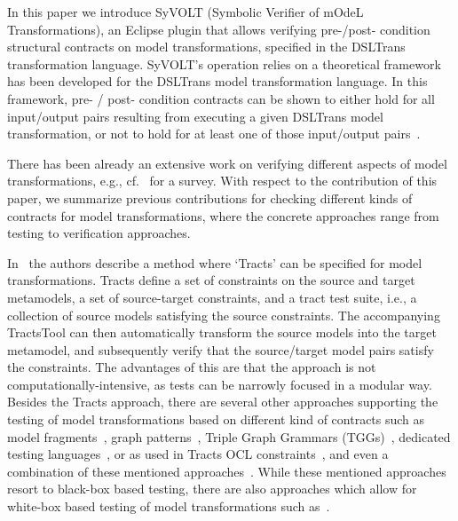 In this paper we introduce SyVOLT (Symbolic Verifier of mOdeL Transformations),
an Eclipse plugin that allows verifying pre-/post- condition structural
contracts on model transformations, specified in the DSLTrans transformation
language. SyVOLT's operation relies on a theoretical framework has been
developed for the DSLTrans model transformation language. In this framework,
pre- / post- condition contracts can be shown to either hold for all input/output pairs resulting from
executing a given DSLTrans model transformation, or not to hold for at least
one of those input/output pairs~\cite{Lucio2014}.


There has been already an extensive work on verifying different aspects of model
transformations, e.g., cf.~\cite{AmraniLSCDVTC12} for a survey.
With respect to the contribution of this paper, we summarize previous
contributions for checking different kinds of contracts for model
transformations, where the concrete approaches range from testing to
verification approaches.

In~\cite{Gogolla2011,Vallecillo2012} the authors describe a method where
`Tracts' can be specified for model transformations. Tracts define a set of
constraints on the source and target metamodels, a set of source-target
constraints, and a tract test suite, i.e., a collection of source models
satisfying the source constraints. The accompanying TractsTool can then
automatically transform the source models into the target metamodel, and
subsequently verify that the source/target model pairs satisfy the constraints.
The advantages of this are that the approach is not computationally-intensive,
as tests can be narrowly focused in a modular way. Besides the Tracts approach,
there are several other approaches supporting the testing of model
transformations based on different kind of contracts such as model
fragments~\cite{Mottu2008}, graph patterns~\cite{Guerra12,BaloghBCGHMPPRVa10},
Triple Graph Grammars (TGGs)~\cite{WieberAS14}, dedicated testing
languages~\cite{Kolovos06,Garcia-Dominguez11}, or as used in Tracts OCL
constraints~\cite{Cariou09}, and even a combination of these mentioned
approaches~\cite{Pele}. While these mentioned approaches resort to black-box
based testing, there are also approaches which allow for white-box based testing
of model transformations such as~\cite{GonzalezC12}.


